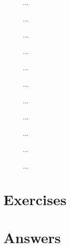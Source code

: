 \begin{description}
\item[]{...}
\item[]{...}
\item[]{...}
\item[]{...}
\item[]{...}
\item[]{...}
\item[]{...}
\item[]{...}
\item[]{...}
\item[]{...}
\item[]{...}
\end{description}

\section{Exercises}


\cleardoublepage
\section{Answers}
\shipoutAnswer
